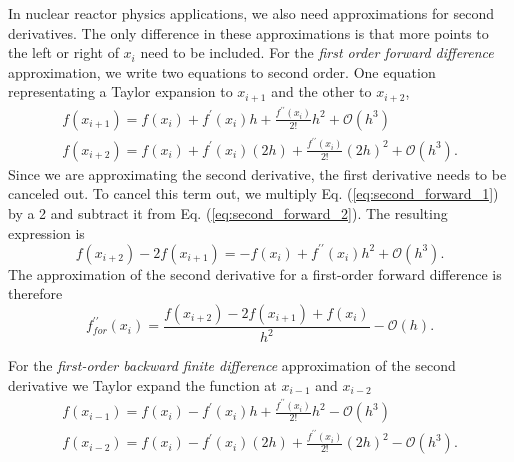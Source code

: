 In nuclear reactor physics applications, we also need approximations for second derivatives.  The only difference in 
these approximations is that more points to the left or right of $x_{i}$ need to be included. For the \emph{first order
forward difference} approximation, we write two equations to second order. One equation representating a Taylor expansion
to $x_{i+1}$ and the other to $x_{i+2}$,
\begin{eqnarray}
    f\left(x_{i+1}\right) = f\left(x_{i}\right) + f^{\prime}\left(x_{i}\right)h + \frac{f^{\prime\prime}\left(x_{i}\right)}{2!}h^{2} + \mathcal{O}\left(h^{3}\right) 
  \label{eq:second_forward_1}
\\
    f\left(x_{i+2}\right) = f\left(x_{i}\right) + f^{\prime}\left(x_{i}\right)\left(2h\right) + \frac{f^{\prime\prime}\left(x_{i}\right)}{2!}\left(2h\right)^{2} + \mathcal{O}\left(h^{3}\right).
  \label{eq:second_forward_2}
\end{eqnarray}
Since we are approximating the second derivative, the first derivative needs to be canceled out. To cancel this term out, 
we multiply Eq. (\ref{eq:second_forward_1}) by a 2 and subtract it from Eq. (\ref{eq:second_forward_2}). The resulting 
expression is
\begin{equation}
    f\left(x_{i+2}\right) - 2f\left(x_{i+1}\right) = -f\left(x_{i}\right) + f^{\prime\prime}\left(x_{i}\right)h^{2} + \mathcal{O}\left(h^{3}\right).
\end{equation}
The approximation of the second derivative for a first-order forward difference is therefore
\begin{equation}
    \boxed{f^{\prime\prime}_{for}\left(x_{i}\right) = \frac{f\left(x_{i+2}\right) - 2f\left(x_{i+1}\right) + f\left(x_{i}\right)}{h^{2}} - \mathcal{O}\left(h\right)}.
\end{equation}
\par 
For the \emph{first-order backward finite difference} approximation of the second derivative we Taylor expand the function at
$x_{i-1}$ and $x_{i-2}$ 
\begin{eqnarray}
    f\left(x_{i-1}\right) = f\left(x_{i}\right) - f^{\prime}\left(x_{i}\right)h + \frac{f^{\prime\prime}\left(x_{i}\right)}{2!}h^{2} - \mathcal{O}\left(h^{3}\right) 
  \label{eq:second_backward_1}
\\
    f\left(x_{i-2}\right) = f\left(x_{i}\right) - f^{\prime}\left(x_{i}\right)\left(2h\right) + \frac{f^{\prime\prime}\left(x_{i}\right)}{2!}\left(2h\right)^{2} - \mathcal{O}\left(h^{3}\right).
  \label{eq:second_backward_2}
\end{eqnarray}
